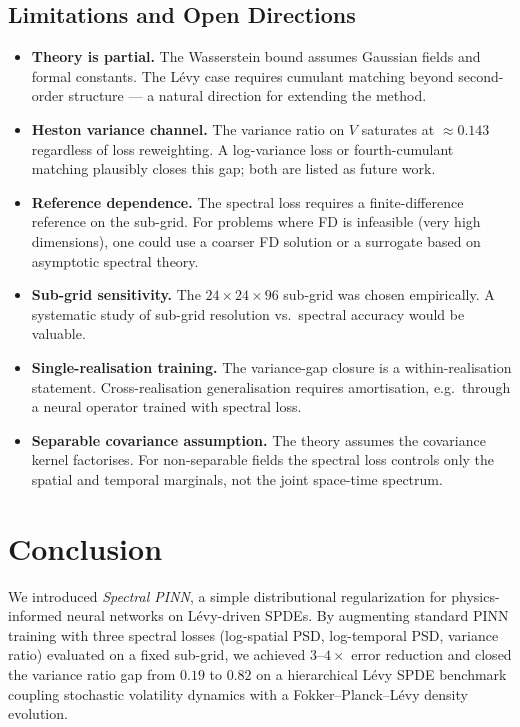 \documentclass[times,12pt]{elsarticle}
\begin{document}
\subsection{Limitations and Open Directions}

\begin{itemize}
    \item \textbf{Theory is partial.} The Wasserstein bound assumes Gaussian
    fields and formal constants. The L\'evy case requires cumulant matching
    beyond second-order structure --- a natural direction for extending the
    method.
    \item \textbf{Heston variance channel.} The variance ratio on $V$ saturates
    at $\approx 0.143$ regardless of loss reweighting. A log-variance loss or
    fourth-cumulant matching plausibly closes this gap; both are listed as
    future work.
    \item \textbf{Reference dependence.} The spectral loss requires a
    finite-difference reference on the sub-grid. For problems where FD is
    infeasible (very high dimensions), one could use a coarser FD solution or
    a surrogate based on asymptotic spectral theory.
    \item \textbf{Sub-grid sensitivity.} The $24 \times 24 \times 96$ sub-grid
    was chosen empirically. A systematic study of sub-grid resolution vs.\
    spectral accuracy would be valuable.
    \item \textbf{Single-realisation training.} The variance-gap closure is a
    within-realisation statement. Cross-realisation generalisation requires
    amortisation, e.g.\ through a neural operator trained with spectral loss.
    \item \textbf{Separable covariance assumption.} The theory assumes the
    covariance kernel factorises. For non-separable fields the spectral loss
    controls only the spatial and temporal marginals, not the joint
    space-time spectrum.
\end{itemize}


\section{Conclusion}
\label{sec:conclusion}

We introduced \emph{Spectral PINN}, a simple distributional regularization for physics-informed neural networks on L\'evy-driven SPDEs. By augmenting standard PINN training with three spectral losses (log-spatial PSD, log-temporal PSD, variance ratio) evaluated on a fixed sub-grid, we achieved $3$--$4\times$ error reduction and closed the variance ratio gap from $0.19$ to $0.82$ on a hierarchical L\'evy SPDE benchmark coupling stochastic volatility dynamics with a Fokker--Planck--L\'evy density evolution.
\end{document}
